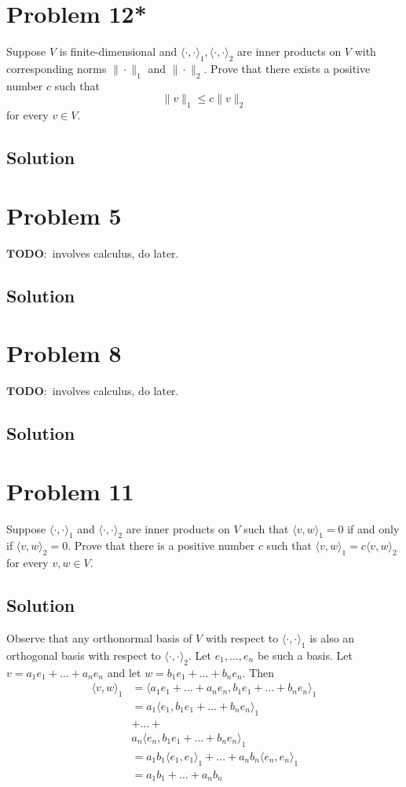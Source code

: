 \documentclass{article}
\begin{document}
\section*{Problem 12*}
Suppose $V$ is finite-dimensional and $\langle\cdot,\cdot\rangle_1,\langle\cdot,\cdot\rangle_2$ are inner products on $V$ with corresponding norms $\|\cdot\|_1$ and $\|\cdot\|_2$. Prove that there exists a positive number $c$ such that
\[\|v\|_1\leq c\|v\|_2\]
for every $v\in V$.

\subsection*{Solution}

\section*{Problem 5}
$\mathbf{TODO:}$ involves calculus, do later.

\subsection*{Solution}

\section*{Problem 8}
$\mathbf{TODO:}$ involves calculus, do later.

\subsection*{Solution}

\section*{Problem 11}
Suppose $\langle \cdot,\cdot\rangle_1$ and $\langle \cdot,\cdot\rangle_2$ are inner products on $V$ such that $\langle v, w\rangle_1=0$ if and only if $\langle v,w\rangle_2=0$. Prove that there is a positive number $c$ such that $\langle v,w\rangle_1=c\langle v,w\rangle_2$ for every $v,w\in V$.

\subsection*{Solution}
Observe that any orthonormal basis of $V$ with respect to $\langle \cdot,\cdot\rangle_1$ is also an orthogonal basis with respect to $\langle \cdot,\cdot\rangle_2$. Let $e_1,\ldots,e_n$ be such a basis. Let $v=a_1e_1+\ldots+a_n e_n$ and let $w=b_1e_1+\ldots+b_n e_n$. Then
\begin{align*}
    \langle v,w\rangle_1&=\langle a_1e_1+\ldots+a_n e_n, b_1e_1+\ldots+b_n e_n\rangle_1\\
    &=a_1\langle e_1, b_1e_1+\ldots+b_n e_n\rangle_1\\
    &+\ldots +\\
    &a_n\langle e_n, b_1e_1+\ldots+b_n e_n\rangle_1\\
    &=a_1b_1\langle e_1, e_1 \rangle_1+\ldots+a_n b_n\langle e_n, e_n \rangle_1\\
    &=a_1b_1+\ldots+a_n b_n
\end{align*}
\end{document}
